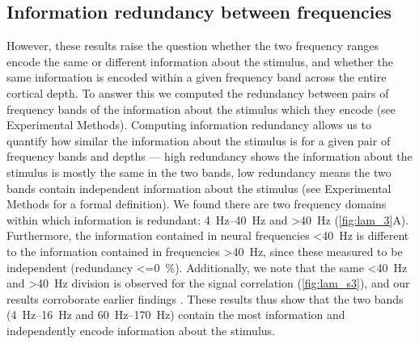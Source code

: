 \subsection{Information redundancy between frequencies}

However, these results raise the question whether the two frequency ranges encode the same or different information about the stimulus, and whether the same information is encoded within a given frequency band across the entire cortical depth. 
To answer this we computed the redundancy between pairs of frequency bands of the information about the stimulus which they encode (see Experimental Methods).
Computing information redundancy allows us to quantify how similar the information about the stimulus is for a given pair of frequency bands and depths --- high redundancy shows the information about the stimulus is mostly the same in the two bands, low redundancy means the two bands contain independent information about the stimulus (see Experimental Methods for a formal definition).
We found there are two frequency domains within which information is redundant: \SIrange{4}{40}{Hz} and \SI{>40}{Hz} (\autoref{fig:lam_3}A).
Furthermore, the information contained in neural frequencies \SI{<40}{Hz} is different to the information contained in frequencies \SI{>40}{Hz}, since these measured to be independent (redundancy \SI{<=0}{\percent}).
Additionally, we note that the same \SI{<40}{Hz} and \SI{>40}{Hz} division is observed for the signal correlation (\autoref{fig:lam_s3}), and our results corroborate earlier findings \citep{Belitski2008}.
These results thus show that the two bands (\SIrange{4}{16}{Hz} and \SIrange{60}{170}{Hz}) contain the most information and independently encode information about the stimulus.

